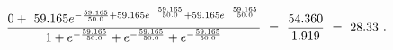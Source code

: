 \documentclass{article}
\begin{document}
\begin{equation} \label{eq:281}
\frac{0 + \hspace{0.125cm} 59.165 e^{-\frac{59.165}{50.0} + 59.165 e^{-\frac{59.165}{50.0}}  + 59.165 e^{-\frac{59.165}{50.0}}}}{1 + e^{-\frac{59.165}{50.0}} + e^{-\frac{59.165}{50.0}} + e^{-\frac{59.165}{50.0}}} \hspace{0.125cm} = \hspace{0.125cm} \frac{54.360}{1.919} \hspace{0.125cm} = \hspace{0.125cm} 28.33 \hspace{0.125cm} .
\end{equation} 
\end{document}
